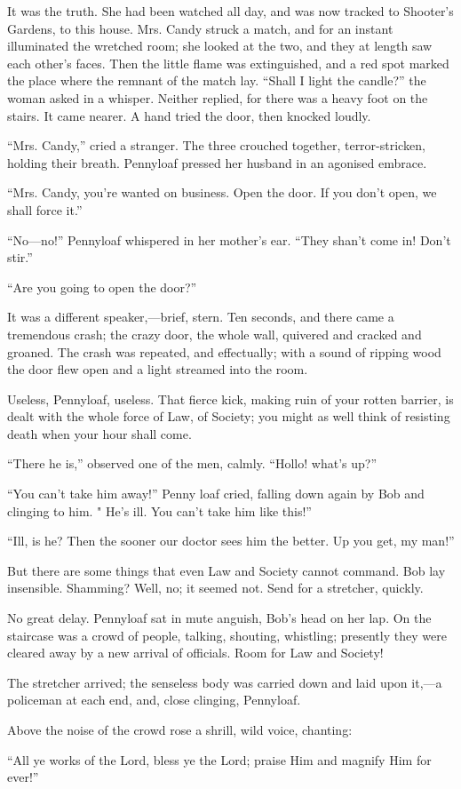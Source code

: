 It was the truth. She had been watched all day, and was now tracked to
Shooter's Gardens, to this house. Mrs. Candy struck a match, and for an
instant illuminated the wretched room; she looked at the two, and they
at length saw each other's faces. Then the little flame was
extinguished, and a red spot marked the place where the remnant of the
match lay. {}``Shall I light the candle?'' the woman asked in a whisper.
Neither replied, for there was a heavy foot on the stairs. It came
nearer. A hand tried the door, then knocked loudly.

``Mrs. Candy,'' cried a stranger. The three crouched together,
terror-stricken, holding their breath. Pennyloaf pressed her husband in
an agonised embrace.

``Mrs. Candy, you're wanted on business. Open the door. If you don't
open, we shall force it.''

``No---no!'' Pennyloaf whispered in her mother's ear. ``They shan't come
in! Don't stir.''

``Are you going to open the door?''

It was a different speaker,---brief, stern. Ten seconds, and there came
a tremendous crash; the crazy door, the whole wall, quivered and cracked
and groaned. The crash was repeated, and effectually; with a sound of
ripping wood the door flew open and a light streamed into the room.

Useless, Pennyloaf, useless. That fierce kick, making ruin of your
rotten barrier, is dealt with the whole force of Law, of Society; {}you
might as well think of resisting death when your hour shall come.

``There he is,'' observed one of the men, calmly. ``Hollo! what's up?''

``You can't take him away!'' Penny loaf cried, falling down again by Bob
and clinging to him. " He's ill. You can't take him like this!''

``Ill, is he? Then the sooner our doctor sees him the better. Up you
get, my man!''

But there are some things that even Law and Society cannot command. Bob
lay insensible. Shamming? Well, no; it seemed not. Send for a stretcher,
quickly.

No great delay. Pennyloaf sat in mute anguish, Bob's head on her lap. On
the staircase was a crowd of people, talking, shouting, whistling;
presently they were cleared away by a new arrival of officials. Room for
Law and Society!

The stretcher arrived; the senseless body was carried down and laid upon
it,---a policeman at each end, and, close clinging, Pennyloaf.

Above the noise of the crowd rose a shrill, wild voice, chanting:

``All ye works of the Lord, bless ye the Lord; praise Him and magnify
Him for ever!''
